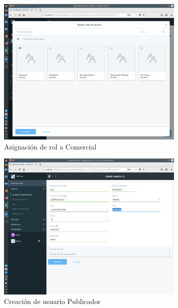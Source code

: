 \begin{figure}[H]
\begin{center}
\includegraphics[width=0.8\textwidth]{./img/liferay/22.png}
\end{center}
\caption{Asignación de rol a Comercial}
\label{img:lr22}
\end{figure}

\begin{figure}[H]
\begin{center}
\includegraphics[width=0.8\textwidth]{./img/liferay/23.png}
\end{center}
\caption{Creación de usuario Publicador}
\label{img:lr23}
\end{figure}

